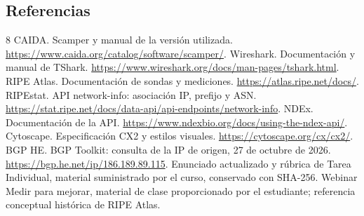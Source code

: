 \subsection{Referencias}\label{anexo:referencias}
\renewcommand{\refname}{}\begin{thebibliography}{8}
 CAIDA. Scamper y manual de la versión utilizada. \url{https://www.caida.org/catalog/software/scamper/}.
 Wireshark. Documentación y manual de TShark. \url{https://www.wireshark.org/docs/man-pages/tshark.html}.
 RIPE Atlas. Documentación de sondas y mediciones. \url{https://atlas.ripe.net/docs/}.
 RIPEstat. API network-info: asociación IP, prefijo y ASN. \url{https://stat.ripe.net/docs/data-api/api-endpoints/network-info}.
 NDEx. Documentación de la API. \url{https://www.ndexbio.org/docs/using-the-ndex-api/}.
 Cytoscape. Especificación CX2 y estilos visuales. \url{https://cytoscape.org/cx/cx2/}.
 BGP HE. BGP Toolkit: consulta de la IP de origen, 27 de octubre de 2026. \url{https://bgp.he.net/ip/186.189.89.115}.
 Enunciado actualizado y rúbrica de Tarea Individual, material suministrado por el curso, conservado con SHA-256. Webinar Medir para mejorar, material de clase proporcionado por el estudiante; referencia conceptual histórica de RIPE Atlas.
\end{thebibliography}
